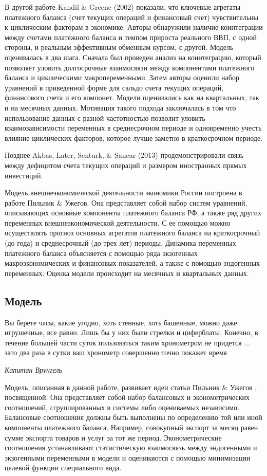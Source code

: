 \documentclass[a4paper, 14pt]{extarticle}
\begin{document}
В другой работе Kandil $\&$ Greene (2002) \autocite{kandil2002impact} показали, что ключевые агрегаты платежного баланса (счет текущих операций и финансовый счет) чувствительны к циклическим факторам в экономике. 
Авторы обнаружили наличие коинтеграции между счетами платежного баланса и темпом прироста реального ВВП, с одной стороны, и реальным эффективным обменным курсом, с другой. Модель оценивалась в два шага. 
Сначала был проведен анализ на коинтеграцию, который позволяет уловить долгосрочные взаимосвязи между компонентами платежного баланса и циклическими макропеременными. 
Затем авторы оценили набор уравнений в приведенной форме для сальдо счета текущих операций, финансового счета и его компонет. 
Модели оценивались как на квартальных, так и на месячных данных. 
Мотивация такого подхода заключалась в том что использование данных с разной частотностью позволит уловить взаимозависимости переменных в среднесрочном периоде и одновременно учесть влияние циклических факторов, которое лучше заметно в краткосрочном периоде.

Позднее Akbas, Later, Senturk, $\&$ Sancar  (2013) \autocite{akbas2013testing} продемонстрировали
 связь между дефицитом счета текущих операций и размером иностранных прямых инвестиций.

Модель внешнеэкономической деятельности экономики России построена в работе Пильник $\&$ Ужегов.
Она представляет собой набор систем уравнений, описывающих основные компоненты платежного баланса РФ, а также ряд других переменных внешнеэкономической деятельности.
С ее помощью можно осуществлять прогноз основных агрегатов платежного баланса на краткосрочный (до года) и среднесрочный (до трех лет) периоды.
Динамика переменных платежного баланса объясняется с помощью ряда экзогенных макроэкономических и финансовых показателей, а также с помощью эндогенных переменных. 
Оценка модели происходит на месячных и квартальных данных.


\newpage
\subsection{Модель}
\epigraph{Вы берете часы, какие угодно, хоть стенные, хоть башенные, можно даже игрушечные, все равно. Лишь бы у них были стрелки и циферблаты. Конечно, в течение большей части суток пользоваться таким хронометром не придется ... зато два раза в сутки ваш хронометр совершенно точно покажет время}{\textit{Капитан Врунгель}}
Модель, описанная в данной работе, развивает идеи статьи Пильник $\&$ Ужегов \autocite{пильник2017модель}, посвященной. 
Она представляет собой набор балансовых и эконометрических соотношений, сгруппированных в системы либо оцениваемых независимо. 
Балансовые соотношения должны быть выполнены по определению той или иной компоненты платежного баланса. 
Например, совокупный экспорт за месяц равен сумме экспорта товаров и услуг за тот же период.
Эконометрические соотношения устанавливают статистическую взаимосвязь между эндогенными и экзогенными переменными в модели и оцениваются с помощью минимизации целевой функции специального вида.
\end{document}
